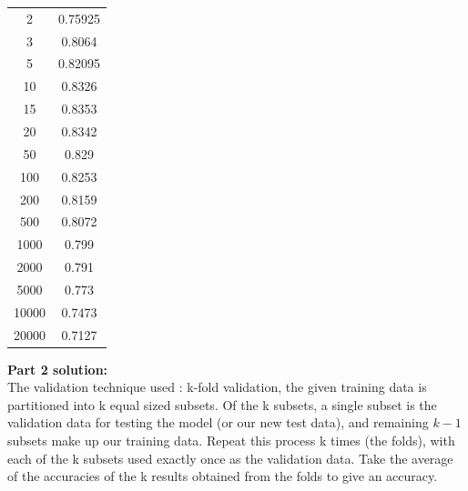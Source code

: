 \documentclass[a4paper,11pt]{article}
\begin{document}
\begin{mlsolution}
\begin{center}
\begin{tabular}{|c|c|}
 2 & 0.75925   \\
 
 3 & 0.8064   \\
 
 5 & 0.82095   \\
 
 10 & 0.8326   \\
 
 15 & 0.8353   \\
 
 20 & 0.8342   \\
 
 50 & 0.829   \\
 
 100 & 0.8253   \\
 
 200 & 0.8159   \\
  
 500 & 0.8072   \\
 
 1000 & 0.799   \\
 
 2000 & 0.791   \\ 
 
 5000 & 0.773  \\
 
 10000 & 0.7473   \\
 
 20000 & 0.7127   \\ [1ex] 
 \hline
\end{tabular}
\end{center}

\newpage
\textbf{Part 2 solution:}\\

The validation technique used : k-fold validation, the given training data is partitioned into k equal sized subsets. Of the k subsets, a single subset is the validation data for testing the model (or our new test data), and remaining \begin{math}k - 1 \end{math} subsets make up our training data. Repeat this process k times (the folds), with each of the k subsets used exactly once as the validation data. Take the average of the accuracies of the k results obtained from the folds to give an accuracy.


\end{mlsolution}
\end{document}
